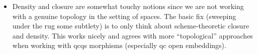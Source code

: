 \documentclass[11pt]{article}
\begin{document}
\begin{itemize}
\item Density and closure are somewhat touchy notions since we are not working with a genuine topology in the setting of spaces. The basic fix (sweeping under the rug some subtlety) is to only think about scheme-theoretic closure and density. This works nicely and agrees with more ``topological'' approaches when working with qcqs morphisms (especially qc open embeddings).
\end{itemize}

\newpage
\printbibliography[title={References}]
\end{document}
